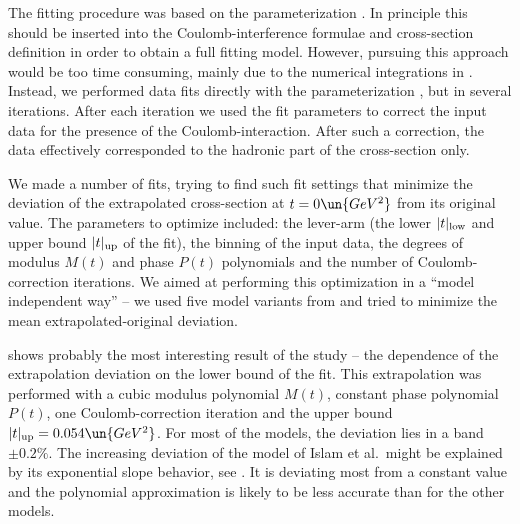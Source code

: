 The fitting procedure was based on the parameterization . In principle this should be inserted into the Coulomb-interference formulae  and cross-section definition  in order to obtain a full fitting model. However, pursuing this approach would be too time consuming, mainly due to the numerical integrations in . Instead, we performed data fits directly with the parameterization , but in several iterations. After each iteration we used the fit parameters to correct the input data for the presence of the Coulomb-interaction. After such a correction, the data effectively corresponded to the hadronic part of the cross-section only.


We made a number of fits, trying to find such fit settings that minimize the deviation of the extrapolated cross-section at $t=0\un{GeV^2}$ from its original value. The parameters to optimize included: the lever-arm (the lower $|t|_{\rm low}$ and upper bound $|t|_{\rm up}$ of the fit), the binning of the input data, the degrees of modulus $M(t)$ and phase $P(t)$ polynomials and the number of Coulomb-correction iterations. We aimed at performing this optimization in a ``model independent way'' -- we used five model variants from  and tried to minimize the mean extrapolated-original deviation.

 shows probably the most interesting result of the study -- the dependence of the extrapolation deviation on the lower bound of the fit. This extrapolation was performed with a cubic modulus polynomial $M(t)$, constant phase polynomial $P(t)$, one Coulomb-correction iteration and the upper bound $|t|_{\rm up} = 0.054\un{GeV^2}$. For most of the models, the deviation lies in a band $\pm 0.2\percent$. The increasing deviation of the model of Islam et al.~might be explained by its exponential slope behavior, see . It is deviating most from a constant value and the polynomial approximation is likely to be less accurate than for the other models.





